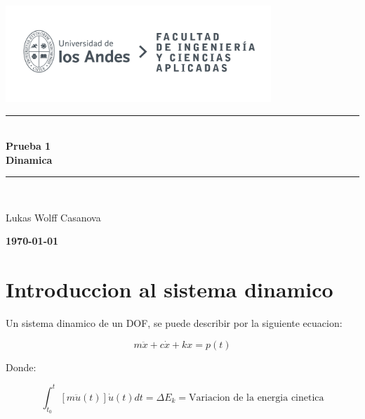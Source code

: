 \documentclass{article}  %
\begin{document}
\begin{titlepage}
\newcommand{\HRule}{\rule{\linewidth}{0.5mm}} 
\center
\includegraphics[width=10cm]{LOGO_UNIVERSIDAD.jpg}\\
\vspace{3cm}
\HRule \\[0.4cm]
{ \huge \bfseries Prueba 1}\\[0.4cm]
{ \huge \bfseries Dinamica}\\[0.4cm]
\HRule \\[1.5cm]
\vspace{7.5cm}
\begin{center}

    \Large Lukas Wolff Casanova\\
\end{center}
\vspace{0.5cm}
{\large \textbf{\today}}\\[2cm]
\end{titlepage}



\newpage
\setcounter{page}{1}


\section{Introduccion al sistema dinamico}

Un sistema dinamico de un DOF, se puede describir por la siguiente ecuacion:

\begin{equation}
    m \ddot{x} + c \dot{x} + kx = p(t)
\end{equation}

Donde:

\begin{equation}
    \int_{t_0}^{t} [m \ddot{u}(t)] \dot{u}(t) dt = \Delta E_k = \text{Variacion de la energia cinetica}
\end{equation}
\end{document}
